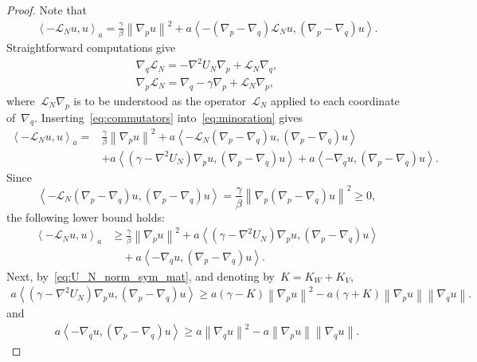 \documentclass[10pt,a4paper]{amsart}
\renewcommand{\geq}{\geqslant}
\newcommand{\mc}[1]{\mathcal{#1}}
\newcommand{\norm}[1]{\left\lVert#1\right\rVert}
\newcommand{\slangle}[1]{\left\langle #1 \right\rangle}
\begin{document}
\begin{proof}
  Note that
\begin{align}
    \label{eq:minoration}
\slangle{-\mc{L}_N u ,u}_a = \frac{\gamma}{\beta}\norm{\nabla_p u}^2
+ a\slangle{-(\nabla_p - \nabla_q)\mc{L}_N u ,(\nabla_p - \nabla_q)u}\!.
\end{align}
Straightforward computations give
\begin{align}
    \label{eq:commutators}
    \nabla_q \mc{L}_N = -\nabla^2U_N\nabla_p + \mc{L}_N\nabla_q, \\
    \nabla_p \mc{L}_N = \nabla_q - \gamma\nabla_p + \mc{L}_N\nabla_p,
\end{align}
where~$\mc{L}_N\nabla_p$ is to be understood as the operator~$\mc{L}_N$ applied to each coordinate of~$\nabla_q$.
Inserting~\eqref{eq:commutators} into~\eqref{eq:minoration} gives
\begin{align*}
    \slangle{-\mc{L}_N u ,u}_a = &\frac{\gamma}{\beta}\norm{\nabla_p u}^2 + a\slangle{-\mc{L}_N(\nabla_p - \nabla_q) u ,(\nabla_p - \nabla_q)u} \\
    &+ a \slangle{(\gamma -\nabla^2U_N) \nabla_pu,(\nabla_p - \nabla_q)u} + a\slangle{-\nabla_qu,(\nabla_p - \nabla_q)u}\!.
\end{align*}
Since
\[
\slangle{-\mc{L}_N(\nabla_p - \nabla_q) u ,(\nabla_p - \nabla_q)u} = \frac{\gamma}{\beta}\norm{\nabla_p(\nabla_p - \nabla_q)u}^2 \geq 0,
\]
the following lower bound holds:
\begin{align*}
    \slangle{-\mc{L}_N u ,u}_a &\geq \frac{\gamma}{\beta}\norm{\nabla_p u}^2
    + a \slangle{(\gamma -\nabla^2U_N) \nabla_p u,(\nabla_p - \nabla_q)u} \\
    &\quad + a\slangle{-\nabla_q u,(\nabla_p - \nabla_q)u}.
\end{align*}
Next, by~\eqref{eq:U_N_norm_sym_mat}, and denoting by~$K = K_W + K_V$,
\begin{align}
    \label{eq:hypo_vil1}
a\slangle{(\gamma -\nabla^2U_N) \nabla_p u,(\nabla_p - \nabla_q) u} \geq a(\gamma - K)\norm{\nabla_p u}^2 - a(\gamma + K)\norm{\nabla_p u}\norm{\nabla_q u}.
\end{align}
and
\begin{align}
    \label{eq:hypo_vil2}
a\slangle{-\nabla_q u,(\nabla_p - \nabla_q) u} \geq a \norm{\nabla_q  u}^2 - a \norm{\nabla_p u}\norm{\nabla_q u}.
\end{align}

\end{proof}
\end{document}
